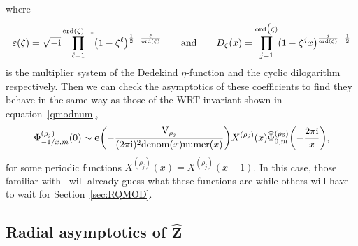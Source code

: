 \documentclass[pdftex]{sigma}
\numberwithin{equation}{section}
\def\z{\zeta}
\def\ae{\sim}
\def\be{\begin{equation}}
\def\ee{\end{equation}}
\def\e{\mathbf e}
\def\Phih{\widehat{\Phi}}
\def\VC{\mathrm{VC}}
\def\denom{\mathrm{denom}}
\def\numer{\mathrm{numer}}
\def\etaroots{\varepsilon}
\def\be{\begin{equation}}
\def\ee{\end{equation}}
\def\z{\zeta}
\def\VC{\mathrm{V}}
\begin{document}
where
\[
 \etaroots(\z)
  =
 \sqrt{-{\rm i}}\prod_{\ell=1}^{\mathrm{ord}(\z)-1}\bigl(1-\z^{\ell}\bigr)^{\frac{1}{2}-\frac{\ell}{\mathrm{ord}(\z)}}
 \qquad\text{and}\qquad
 D_{\z}(x)
  =
 \prod_{j=1}^{\mathrm{ord}\bigl(\z)}(1-\z^{j}x\bigr)^{\frac{j}{\mathrm{ord}(\z)}-\frac{1}{2}}
\]
is the multiplier system of the Dedekind $\eta$-function and the cyclic dilogarithm respectively. Then we can check the asymptotics of these coefficients to find they behave in the same way as those of the WRT invariant shown in equation~\eqref{qmodnum},
\be\label{eq:phiqmod}
 \Phi^{(\rho_j)}_{-1/x,m}(0)
 \ae\e\biggl({-}\frac{\VC_{\rho_j}}{(2\pi {\rm i})^2\denom(x)\numer(x)}\biggr)X^{(\rho_j)}(x)
 \Phih^{(\rho_6)}_{0,m}\biggl({-}\frac{2\pi {\rm i}}{x}\biggr) ,
\ee
for some periodic functions $X^{(\rho_j)}(x)=X^{(\rho_j)}(x+1)$. In this case, those familiar with~\cite{GZ:RQMOD} will already guess what these functions are while others will have to wait for Section~\ref{sec:RQMOD}.

\subsection[Radial asymptotics of $\widehat{Z}$]{Radial asymptotics of $\boldsymbol{\widehat{Z}}$}
\label{radzhat}
\end{document}
